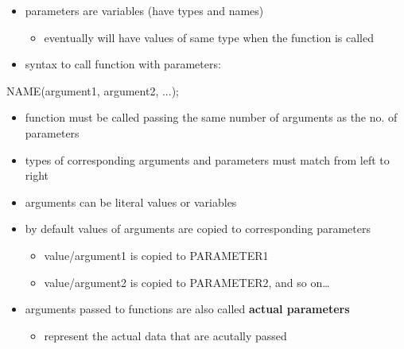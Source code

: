 \documentclass[11pt]{article}
\providecommand{\tightlist}{%
      \setlength{\itemsep}{0pt}\setlength{\parskip}{0pt}}
\newenvironment{Shaded}{}{}
\newcommand{\NormalTok}[1]{{#1}}
\newcommand{\OperatorTok}[1]{\textcolor[rgb]{0.40,0.40,0.40}{{#1}}}
\begin{document}
\begin{itemize}
\tightlist
\item
  parameters are variables (have types and names)

  \begin{itemize}
  \tightlist
  \item
    eventually will have values of same type when the function is called
  \end{itemize}
\item
  syntax to call function with parameters:
\end{itemize}

\begin{Shaded}
\begin{Highlighting}[]
\NormalTok{    NAME}\OperatorTok{(}\NormalTok{argument1}\OperatorTok{,}\NormalTok{ argument2}\OperatorTok{,} \OperatorTok{...);}
\end{Highlighting}
\end{Shaded}

\begin{itemize}
\tightlist
\item
  function must be called passing the same number of arguments as the
  no. of parameters
\item
  types of corresponding arguments and parameters must match from left
  to right
\item
  arguments can be literal values or variables
\item
  by default values of arguments are copied to corresponding parameters

  \begin{itemize}
  \tightlist
  \item
    value/argument1 is copied to PARAMETER1
  \item
    value/argument2 is copied to PARAMETER2, and so on\ldots{}
  \end{itemize}
\item
  arguments passed to functions are also called \textbf{actual
  parameters}

  \begin{itemize}
  \tightlist
  \item
    represent the actual data that are acutally passed
  \end{itemize}
\end{itemize}
\end{document}

